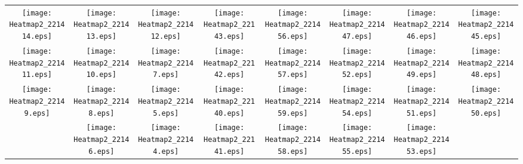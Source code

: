 \documentclass{standalone}
\begin{document}
\begin{tabular}{ *8{c} }
\texttt{[image: Heatmap2\_221414.eps]} & \texttt{[image: Heatmap2\_221413.eps]} & \texttt{[image: Heatmap2\_221412.eps]} & \texttt{[image: Heatmap2\_22143.eps]} & \texttt{[image: Heatmap2\_221456.eps]} & \texttt{[image: Heatmap2\_221447.eps]} & \texttt{[image: Heatmap2\_221446.eps]} & \texttt{[image: Heatmap2\_221445.eps]} \\
\texttt{[image: Heatmap2\_221411.eps]} & \texttt{[image: Heatmap2\_221410.eps]} & \texttt{[image: Heatmap2\_22147.eps]} & \texttt{[image: Heatmap2\_22142.eps]} & \texttt{[image: Heatmap2\_221457.eps]} & \texttt{[image: Heatmap2\_221452.eps]} & \texttt{[image: Heatmap2\_221449.eps]} & \texttt{[image: Heatmap2\_221448.eps]} \\
\texttt{[image: Heatmap2\_22149.eps]} & \texttt{[image: Heatmap2\_22148.eps]} & \texttt{[image: Heatmap2\_22145.eps]} & \texttt{[image: Heatmap2\_22140.eps]} & \texttt{[image: Heatmap2\_221459.eps]} & \texttt{[image: Heatmap2\_221454.eps]} & \texttt{[image: Heatmap2\_221451.eps]} & \texttt{[image: Heatmap2\_221450.eps]} \\
 & \texttt{[image: Heatmap2\_22146.eps]} & \texttt{[image: Heatmap2\_22144.eps]} & \texttt{[image: Heatmap2\_22141.eps]} & \texttt{[image: Heatmap2\_221458.eps]} & \texttt{[image: Heatmap2\_221455.eps]} & \texttt{[image: Heatmap2\_221453.eps]} &  
\end{tabular}
\end{document}
